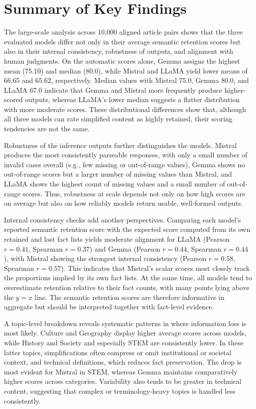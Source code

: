 \documentclass{DESSThesis}
\begin{document}
\section{Summary of Key Findings}
The large-scale analysis across 10{,}000 aligned article pairs shows that the three evaluated models differ not only in their average semantic retention scores but also in their internal consistency, robustness of outputs, and alignment with human judgments. On the automatic scores alone, Gemma assigns the highest mean (75.10) and median (80.0), while Mistral and LLaMA yield lower means of 66.65 and 65.62, respectively. Median values with Mistral 75.0, Gemma 80.0, and LLaMA 67.0 indicate that Gemma and Mistral more frequently produce higher-scored outputs, whereas LLaMA’s lower median suggests a flatter distribution with more moderate scores. These distributional differences show that, although all three models can rate simplified content as highly retained, their scoring tendencies are not the same.

Robustness of the inference outputs further distinguishes the models. Mistral produces the most consistently parseable responses, with only a small number of invalid cases overall (e.g., few missing or out-of-range values), Gemma shows no out-of-range scores but a larger number of missing values than Mistral, and LLaMA shows the highest count of missing values and a small number of out-of-range scores. Thus, robustness at scale depends not only on how high scores are on average but also on how reliably models return usable, well-formed outputs.

Internal consistency checks add another perspectives. Comparing each model’s reported semantic retention score with the expected score computed from its own retained and lost fact lists yields moderate alignment for LLaMA (Pearson $r=0.41$, Spearman $r=0.37$) and Gemma (Pearson $r=0.44$, Spearman $r=0.44$), with Mistral showing the strongest internal consistency (Pearson $r=0.58$, Spearman $r=0.57$). This indicates that Mistral’s scalar scores most closely track the proportions implied by its own fact lists. At the same time, all models tend to overestimate retention relative to their fact counts, with many points lying above the $y{=}x$ line. The semantic retention scores are therefore informative in aggregate but should be interpreted together with fact-level evidence.

A topic-level breakdown reveals systematic patterns in where information loss is most likely. Culture and Geography display higher average scores across models, while History and Society and especially STEM are consistently lower. In these latter topics, simplifications often compress or omit institutional or societal context, and technical definitions, which reduces fact preservation. The drop is most evident for Mistral in STEM, whereas Gemma maintains comparatively higher scores across categories. Variability also tends to be greater in technical content, suggesting that complex or terminology-heavy topics is handled less consistently.
\end{document}
